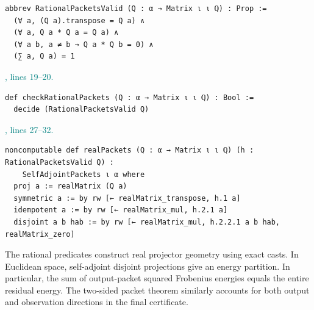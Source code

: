 \documentclass[11pt]{article}\usepackage{needspace}\renewcommand{\paperkind}{Lean companion}\setlength{\parskip}{0.35em}
\begin{document}
\begin{lstlisting}[style=BayesSource]
abbrev RationalPacketsValid (Q : α → Matrix ι ι ℚ) : Prop :=
  (∀ a, (Q a).transpose = Q a) ∧
  (∀ a, Q a * Q a = Q a) ∧
  (∀ a b, a ≠ b → Q a * Q b = 0) ∧
  (∑ a, Q a) = 1
\end{lstlisting}



{\small\textcolor{teal}{, lines 19--20.}\par}

\begin{lstlisting}[style=BayesSource]
def checkRationalPackets (Q : α → Matrix ι ι ℚ) : Bool :=
  decide (RationalPacketsValid Q)
\end{lstlisting}



{\small\textcolor{teal}{, lines 27--32.}\par}

\begin{lstlisting}[style=BayesSource]
noncomputable def realPackets (Q : α → Matrix ι ι ℚ) (h : RationalPacketsValid Q) :
    SelfAdjointPackets ι α where
  proj a := realMatrix (Q a)
  symmetric a := by rw [← realMatrix_transpose, h.1 a]
  idempotent a := by rw [← realMatrix_mul, h.2.1 a]
  disjoint a b hab := by rw [← realMatrix_mul, h.2.2.1 a b hab, realMatrix_zero]
\end{lstlisting}

The rational predicates construct real projector geometry using exact casts. In Euclidean space, self-adjoint disjoint projections give an energy partition. In particular, the sum of output-packet squared Frobenius energies equals the entire residual energy. The two-sided packet theorem similarly accounts for both output and observation directions in the final certificate.

\end{document}
